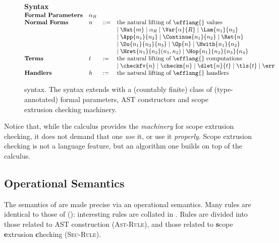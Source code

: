 \begin{figure}
\begin{core-desc}
  {\large \textbf{Syntax}} \\

  $\begin{array}{@{}llll}
    \textbf{Formal Parameters} & \alpha_R \\
    \textbf{Normal Forms} & n & ::= & \text{the natural lifting of \efflang{} values} \\
    &&& \mid  \Nat{m} \mid \alpha_R \mid \Var{\alpha}{R} \mid \Lam{n_1}{n_2}  \\ 
  &&&\mid \App{n_1}{n_2} \mid \Continue{n_1}{n_2} \mid \Ret{n}   \\ 
  &&& \mid \Do{n_1}{n_2}{n_3} \mid \Op{n} \mid \Hwith{n_1}{n_2}   \\
  &&&\mid \Hret{n_1}{n_2}(n_1, n_2) \mid \Hop{n_1}{n_2}{n_3}{n_4} \\
  \textbf{Terms} & t & := & \text{the natural lifting of \efflang{} computations} \\
  &&& \mid \checkfv{n} \mid \checkm{n} \mid \dlet{n}{t} \mid \tls{t} \mid \err \\
  \textbf{Handlers} & h & := & \text{the natural lifting of \efflang{} handlers} \\
  \end{array}$
\end{core-desc}
\caption{\coreLang{} syntax. The syntax extends \efflang{} with a (countably finite) class of (type-annotated) formal parameters, AST constructors and scope extrusion checking machinery.}
\label{fig:core-syntax}
\end{figure}

Notice that, while the calculus provides the \textit{machinery} for scope extrusion checking, it does not demand that one \textit{use} it, or use it \textit{properly}. Scope extrusion checking is not a language feature, but an algorithm one builds on top of the calculus. 
\subsection{Operational Semantics}
The semantics of \coreLang{} are made precise via an operational semantics. Many rules are identical to those of \efflang{} (): interesting rules are collated in . Rules are divided into those related to AST construction (\textsc{Ast-Rule}), and those related to \textbf{s}cope \textbf{e}xtrusion \textbf{c}hecking (\textsc{Sec-Rule}).


